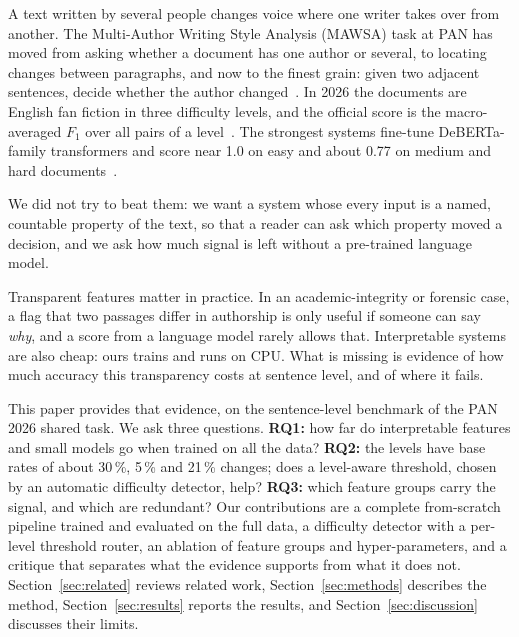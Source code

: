 \documentclass[runningheads]{llncs}
\begin{document}
A text written by several people changes voice where one writer takes over from another. The Multi-Author Writing Style Analysis (MAWSA) task at PAN has moved from asking whether a document has one author or several, to locating changes between paragraphs, and now to the finest grain: given two adjacent sentences, decide whether the author changed~\cite{zangerle2020overview,bevendorff2021overview,zangerle2025overview,zangerle:2026}. In 2026 the documents are English fan fiction in three difficulty levels, and the official score is the macro-averaged $F_1$ over all pairs of a level~\cite{zangerle:2026,bevendorff:2026b}. The strongest systems fine-tune DeBERTa-family transformers and score near 1.0 on easy and about 0.77 on medium and hard documents~\cite{zangerle:2026}.

We did not try to beat them: we want a system whose every input is a named, countable property of the text, so that a reader can ask which property moved a decision, and we ask how much signal is left without a pre-trained language model.

Transparent features matter in practice. In an academic-integrity or forensic case, a flag that two passages differ in authorship is only useful if someone can say \emph{why}, and a score from a language model rarely allows that. Interpretable systems are also cheap: ours trains and runs on CPU. What is missing is evidence of how much accuracy this transparency costs at sentence level, and of where it fails.

This paper provides that evidence, on the sentence-level benchmark of the PAN 2026 shared task. We ask three questions. \textbf{RQ1:} how far do interpretable features and small models go when trained on all the data? \textbf{RQ2:} the levels have base rates of about 30\,\%, 5\,\% and 21\,\% changes; does a level-aware threshold, chosen by an automatic difficulty detector, help? \textbf{RQ3:} which feature groups carry the signal, and which are redundant? Our contributions are a complete from-scratch pipeline trained and evaluated on the full data, a difficulty detector with a per-level threshold router, an ablation of feature groups and hyper-parameters, and a critique that separates what the evidence supports from what it does not. Section~\ref{sec:related} reviews related work, Section~\ref{sec:methods} describes the method, Section~\ref{sec:results} reports the results, and Section~\ref{sec:discussion} discusses their limits.

\end{document}
